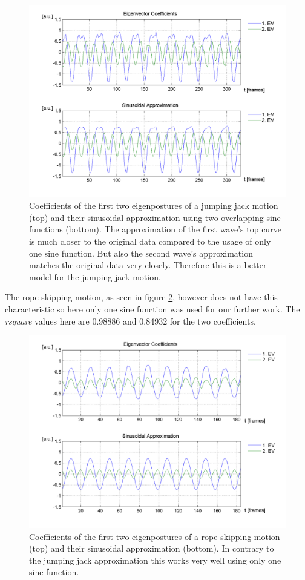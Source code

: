 \documentclass[a4paper]{article}
\begin{document}
\begin{figure}
		\centering
		\includegraphics[width=\textwidth]{2sinHamp.png}
		\caption{Coefficients of the first two eigenpostures of a jumping jack motion (top) and their sinusoidal approximation using two overlapping sine functions (bottom).
		The approximation of the first wave's top curve is much closer to the original data compared to the usage of only one sine function.
		But also the second wave's approximation matches the original data very closely.
		Therefore this is a better model for the jumping jack motion.}
		\label{fig:approx2}
\end{figure}

The rope skipping motion, as seen in figure \ref{fig:approx3}, however does not have this characteristic so here only one sine function was used for our further work.
The \emph{rsquare} values here are 0.98886 and 0.84932 for the two coefficients.

\begin{figure}
		\centering
		\includegraphics[width=\textwidth]{1sinSeil.png}
		\caption{Coefficients of the first two eigenpostures of a rope skipping motion (top) and their sinusoidal approximation (bottom).
		In contrary to the jumping jack approximation this works very well using only one sine function.}
		\label{fig:approx3}
\end{figure}
\end{document}
